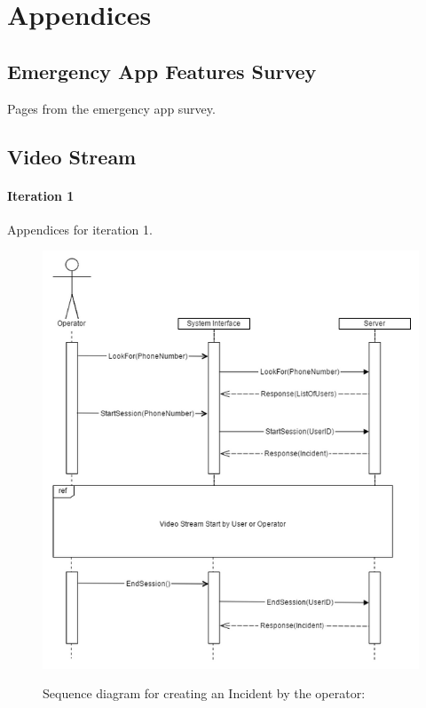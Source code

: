 \documentclass{article}
\begin{document}
\pagebreak
    \section{Appendices}
    \subsection{Emergency App Features Survey} Pages from the emergency app survey.


\begin{figure}[htp] \centering{
}
\end{figure}
\pagebreak

     
    
    
	
    \subsection{Video Stream}
    \paragraph{Iteration 1} Appendices for iteration 1.
    
	\begin{figure}[H]
		\centering
		\includegraphics[width=.9\textwidth]{"VideoStream/1"}

		Sequence diagram for creating an Incident by the operator:
	\end{figure} \clearpage
	
\end{document}
